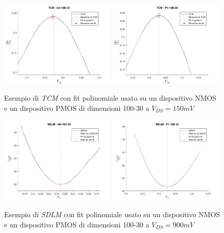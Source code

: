 \documentclass[12pt, letterpaper]{book}
\begin{document}
\begin{figure}[h!]
\centering
 \includegraphics[width=0.49\textwidth]{TCM-N4-100-30}
 \includegraphics[width=0.49\textwidth]{TCM-P1-100-30}
 \caption{Esempio di \emph{TCM} con fit polinomiale usato su un dispositivo NMOS e un dispositivo PMOS di dimensioni 100-30 a $V_{DS} = 150 mV$}
 \includegraphics[width=0.49\textwidth]{SDLM-N4-100-30}
 \includegraphics[width=0.49\textwidth]{SDLM-P1-100-30}
 \caption{Esempio di \emph{SDLM} con fit polinomiale usato su un dispositivo NMOS e un dispositivo PMOS di dimensioni 100-30 a $V_{DS} = 900 mV$}
\end{figure}
\end{document}
